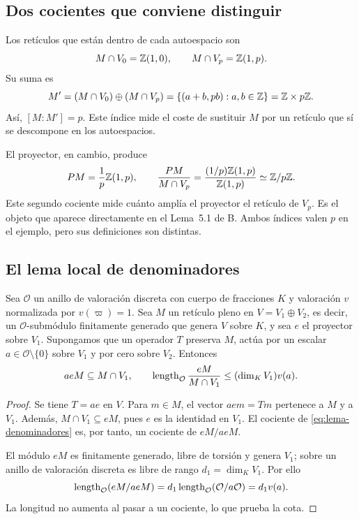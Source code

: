 \subsection{Dos cocientes que conviene distinguir}

Los retículos que están dentro de cada autoespacio son
\[
 M\cap V_0=\mathbb{Z}(1,0),\qquad M\cap V_p=\mathbb{Z}(1,p).
\]
Su suma es
\[
 M'=(M\cap V_0)\oplus(M\cap V_p)
    =\{(a+b,pb):a,b\in\mathbb{Z}\}=\mathbb{Z}\times p\mathbb{Z}.
\]
Así, $[M:M']=p$. Este índice mide el coste de sustituir $M$ por un
retículo que sí se descompone en los autoespacios.

El proyector, en cambio, produce
\[
 PM=\frac1p\mathbb{Z}(1,p),
 \qquad
 \frac{PM}{M\cap V_p}
 =\frac{(1/p)\mathbb{Z}(1,p)}{\mathbb{Z}(1,p)}\simeq\mathbb{Z}/p\mathbb{Z}.
\]
Este segundo cociente mide cuánto amplía el proyector el retículo de
$V_p$. Es el objeto que aparece directamente en el Lema~5.1 de B.
Ambos índices valen $p$ en el ejemplo, pero sus definiciones son distintas.

\subsection{El lema local de denominadores}

\begin{lema}
Sea $\mathcal O$ un anillo de valoración discreta con cuerpo de fracciones
$K$ y valoración $v$ normalizada por $v(\varpi)=1$. Sea $M$ un retículo
pleno en $V=V_1\oplus V_2$, es decir, un $\mathcal O$-submódulo
finitamente generado que genera $V$ sobre $K$, y sea $e$ el proyector sobre $V_1$.
Supongamos que un operador $T$ preserva $M$, actúa por un escalar
$a\in\mathcal O\setminus\{0\}$ sobre $V_1$ y por cero sobre $V_2$.
Entonces
\begin{equation}
 aeM\subseteq M\cap V_1,
 \qquad
 \operatorname{length}_{\mathcal O}\frac{eM}{M\cap V_1}
 \le (\dim_K V_1)v(a).
 \label{eq:lema-denominadores}
\end{equation}
\end{lema}

\begin{proof}
Se tiene $T=ae$ en $V$. Para $m\in M$, el vector $aem=Tm$ pertenece
a $M$ y a $V_1$. Además, $M\cap V_1\subseteq eM$, pues $e$ es la
identidad en $V_1$. El cociente de \eqref{eq:lema-denominadores} es,
por tanto, un cociente de $eM/aeM$.

El módulo $eM$ es finitamente generado, libre de torsión y genera $V_1$;
sobre un anillo de valoración discreta es libre de rango $d_1=\dim_K V_1$.
Por ello
\[
 \operatorname{length}_{\mathcal O}(eM/aeM)
 =d_1\operatorname{length}_{\mathcal O}(\mathcal O/a\mathcal O)=d_1v(a).
\]
La longitud no aumenta al pasar a un cociente, lo que prueba la cota.
\end{proof}

